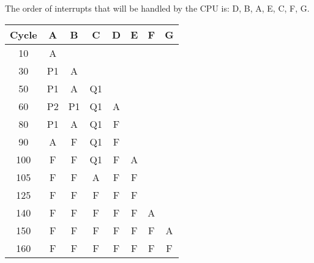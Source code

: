 The order of interrupts that will be handled by the CPU is: D, B, A, E, C, F, G.

\begin{table}
    \centering
    \begin{tabular}{|c||c|c|c|c|c|c|c|}
        \hline
        \textbf{Cycle} & A & B & C & D & E & F & G \\ \hline
        10 & A & & & & & & \\ \hline
        30 & P1 & A & & & & & \\ \hline
        50 & P1 & A & Q1 & & & & \\ \hline
        60 & P2 & P1 & Q1 & A & & & \\ \hline
        80 & P1 & A & Q1 & F & & & \\ \hline
        90 & A & F & Q1 & F & & & \\ \hline
        100 & F & F & Q1 & F & A & & \\ \hline
        105 & F & F & A & F & F & & \\ \hline
        125 & F & F & F & F & F & & \\ \hline
        140 & F & F & F & F & F & A & \\ \hline
        150 & F & F & F & F & F & F & A \\ \hline
        160 & F & F & F & F & F & F & F \\ \hline
    \end{tabular}
\end{table}